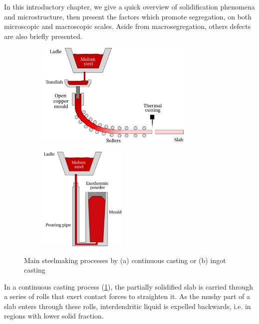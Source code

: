 In this introductory chapter, we give a quick overview of solidification phenomena and microstructure, then present the factors which
promote segregation, on both microscopic and macroscopic scales. Aside from macrosegregation, others defects are also briefly presented.
\begin{figure}[htbp]
\centering
  \begin{subfigure}[t]{0.6\textwidth}
    \centering
	\includegraphics[height=5cm]{Chapter0/Graphics/fig_continuous_casting.pdf}
	\caption{}
    \label{fig:continuous_casting}
  \end{subfigure}
   \begin{subfigure}[t]{0.3\textwidth}
    \centering
	\includegraphics[height=5cm]{Chapter0/Graphics/fig_ingot_casting.pdf}
	\caption{}
    \label{fig:ingot_casting}
  \end{subfigure}
\caption{Main steelmaking processes by (a) continuous casting or (b) ingot casting} 
\label{fig:casting}
\end{figure}
%
%
In a continuous casting process (\cref{fig:continuous_casting}), the partially solidified slab is carried through a series of rolls that exert contact forces to straighten it.
As the mushy part of a slab enters through these rolls, interdendritic liquid is expelled backwards, i.e. in regions with lower solid fraction.

